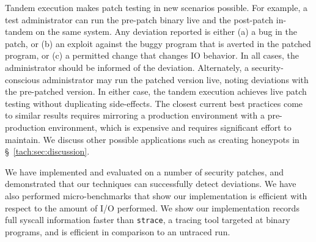 

Tandem execution makes patch testing in new scenarios possible.
For
example, a test administrator can run the pre-patch binary live and the
post-patch in-tandem on the same system.  Any deviation reported is
either (a) a bug in the patch, or (b) an exploit against the buggy
program that is averted in the patched program, or (c) a permitted
change that changes IO behavior.  In all cases, the administrator
should be informed of the deviation.  Alternately, a
security-conscious administrator may run the patched version live,
noting deviations with the pre-patched version.  In either case,
the tandem execution achieves live patch testing without duplicating
side-effects. The closest current best practices come to similar
results requires mirroring a production environment with a
pre-production environment, which is expensive and requires
significant effort to maintain.  We discuss other possible
applications such as creating honeypots in \S~\ref{tach:sec:discussion}.



We have implemented and evaluated \tachyon on a number of security
patches, and demonstrated that our techniques can successfully detect
deviations.  We have also performed micro-benchmarks that show 
our implementation is efficient with respect to the amount of I/O
performed. We show our implementation records full syscall
information faster than \texttt{strace}, a tracing tool targeted at
binary programs, and is efficient in comparison to an untraced run.

